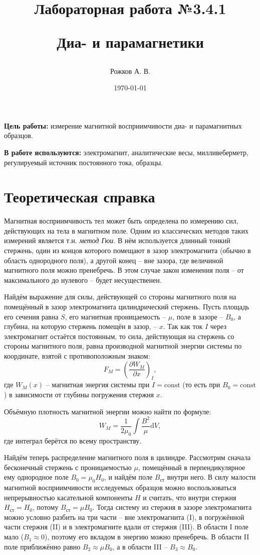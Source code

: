 \documentclass[a4paper, 12pt]{article}
\title{\begin{center}Лабораторная работа №3.4.1\end{center}
Диа- и парамагнетики}
\author{Рожков А. В.}
\date{\today}
\begin{document}
    \maketitle
    \newpage

    \textbf{Цель работы:} измерение магнитной восприимчивости диа- и парамагнитных образцов.

    \textbf{В работе используются:} электромагнит, аналитические весы, милливеберметр, регулируемый источник постоянного тока, образцы.

    \section{Теоретическая справка}

        Магнитная восприимчивость тел может быть определена по измерению сил, действующих на тела в магнитном поле. Одним из классических методов таких измерений является т.н. \textit{метод Гюи}. В нём используется длинный тонкий стержень, один из концов которого помещают в зазор электромагнита (обычно в область однородного поля), а другой конец -- вне зазора, где величиной магнитного поля можно пренебречь. В этом случае закон изменения поля -- от максимального до нулевого -- будет несущественен.

        Найдём выражение для силы, действующей со стороны магнитного поля на помещённый в зазор электромагнита цилиндрический стержень. Пусть площадь его сечения равна $S$, его магнитная проницаемость -- $\mu$, поле в зазоре -- $B_0$, а глубина, на которую стержень помещён в зазор, -- $x$. Так как ток $I$ через электромагнит остаётся постоянным, то сила, действующая на стержень со стороны магнитного поля, равна производной магнитной энергии системы по координате, взятой с противоположным знаком:\[F_M=\left(\frac{\partial W_M}{\partial x}\right)_I,\]где $W_M(x)$ -- магнитная энергия системы при $I=\text{const}$ (то есть при $B_0=\text{const}$) в зависимости от глубины погружения стержня $x$.

        Объёмную плотность магнитной энергии можно найти по формуле:\[W_M=\frac{1}{2\mu_0}\int\frac{B^2}{\mu}\text{d}V,\]где интеграл берётся по всему пространству.

        Найдём теперь распределение магнитного поля в цилиндре. Рассмотрим сначала бесконечный стержень с проницаемостью $\mu$, помещённый в перпендикулярное ему однородное поле $B_0=\mu_0H_0$, и найдём поле $B_{\text{ст}}$ внутри него. В силу малости магнитной восприимчивости исследуемых образцов можно воспользоваться непрерывностью касательной компоненты $H$ и считать, что внутри стержня $H_{\text{ст}}=H_0$, потому $B_{\text{ст}}=\mu B_0$. Тогда систему из стержня в зазоре электромагнита можно условно разбить на три части -- вне электромагнита (I), в погружённой части стержня (II) и в электромагните вдали от стержня (III). В области I поле мало ($B_1\approx0$), поэтому его вкладом в энергию можно пренебречь. В области II поле приближённо равно $B_2\approx\mu B_0$, а в области III -- $B_3\approx B_0$.
\end{document}
